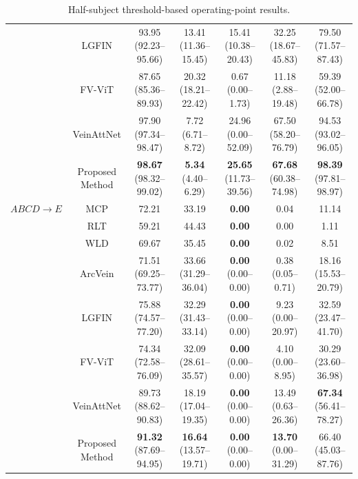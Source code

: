 \documentclass[10pt,journal,compsoc]{IEEEtran}
\begin{document}
\begin{table}[ht!]
{\begin{tabular}{|c|c|c|c|c|c|c|}
         & LGFIN \cite{lgfin} & 93.95 (92.23--95.66) & 13.41 (11.36--15.45) & 15.41 (10.38--20.43) & 32.25 (18.67--45.83) & 79.50 (71.57--87.43) \\
         & FV-ViT \cite{vit} & 87.65 (85.36--89.93) & 20.32 (18.21--22.42) & 0.67 (0.00--1.73) & 11.18 (2.88--19.48) & 59.39 (52.00--66.78) \\
         & VeinAttNet \cite{veinatnnet} & 97.90 (97.34--98.47) & 7.72 (6.71--8.72) & 24.96 (0.00--52.09) & 67.50 (58.20--76.79) & 94.53 (93.02--96.05) \\
         & Proposed Method & \textbf{98.67} (98.32--99.02) & \textbf{5.34} (4.40--6.29) & \textbf{25.65} (11.73--39.56) & \textbf{67.68} (60.38--74.98) & \textbf{98.39} (97.81--98.97) \\
        \hline
        $ABCD \rightarrow E$ & MCP \cite{mcp} & 72.21 & 33.19 & \textbf{0.00} & 0.04 & 11.14 \\
         & RLT \cite{rlt} & 59.21 & 44.43 & \textbf{0.00} & 0.00 & 1.11 \\
         & WLD \cite{wld} & 69.67 & 35.45 & \textbf{0.00} & 0.02 & 8.51 \\
         & ArcVein \cite{arcvein} & 71.51 (69.25--73.77) & 33.66 (31.29--36.04) & \textbf{0.00} (0.00--0.00) & 0.38 (0.05--0.71) & 18.16 (15.53--20.79) \\
         & LGFIN \cite{lgfin} & 75.88 (74.57--77.20) & 32.29 (31.43--33.14) & \textbf{0.00} (0.00--0.00) & 9.23 (0.00--20.97) & 32.59 (23.47--41.70) \\
         & FV-ViT \cite{vit} & 74.34 (72.58--76.09) & 32.09 (28.61--35.57) & \textbf{0.00} (0.00--0.00) & 4.10 (0.00--8.95) & 30.29 (23.60--36.98) \\
         & VeinAttNet \cite{veinatnnet} & 89.73 (88.62--90.83) & 18.19 (17.04--19.35) & \textbf{0.00} (0.00--0.00) & 13.49 (0.63--26.36) & \textbf{67.34} (56.41--78.27) \\
         & Proposed Method & \textbf{91.32} (87.69--94.95) & \textbf{16.64} (13.57--19.71) & \textbf{0.00} (0.00--0.00) & \textbf{13.70} (0.00--31.29) & 66.40 (45.03--87.76) \\
        \hline
    \end{tabular}}
    \caption{Half-subject threshold-based operating-point results.}
    \label{tab:rebuttal_half_thresholds}
\end{table}
\end{document}
